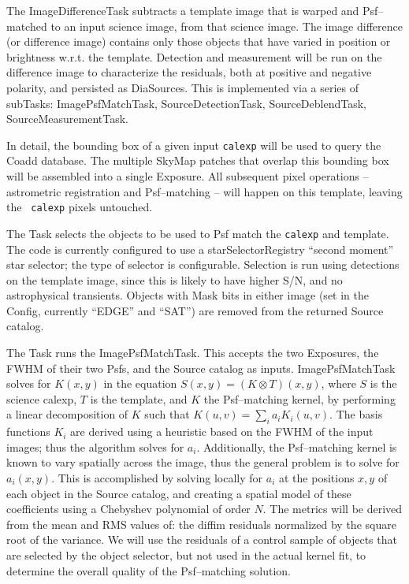 \documentclass[prd, nofootinbib, floatfix, 11pt,tightenlines,times]{article}
\begin{document}

The ImageDifferenceTask subtracts a template image that is warped and
Psf--matched to an input science image, from that science image.  The
image difference (or difference image) contains only those objects
that have varied in position or brightness w.r.t. the template.
Detection and measurement will be run on the difference image to
characterize the residuals, both at positive and negative polarity,
and persisted as DiaSources.  This is implemented via a series of
subTasks: ImagePsfMatchTask, SourceDetectionTask, SourceDeblendTask,
SourceMeasurementTask.

In detail, the bounding box of a given input {\tt calexp} will be used
to query the Coadd database.  The multiple SkyMap patches that overlap
this bounding box will be assembled into a single Exposure.  All
subsequent pixel operations -- astrometric registration and
Psf--matching -- will happen on this template, leaving the {\tt
  calexp} pixels untouched.

The Task selects the objects to be used to Psf match the {\tt calexp}
and template.  The code is currently configured to use a
starSelectorRegistry ``second moment'' star selector; the type of
selector is configurable.  Selection is run using detections on the
template image, since this is likely to have higher S/N,
and no astrophysical transients.  Objects with Mask bits in either
image (set in the Config, currently ``EDGE'' and ``SAT'') are removed
from the returned Source catalog.

The Task runs the ImagePsfMatchTask.  This accepts the two
Exposures, the FWHM of their two Psfs, and the Source catalog as
inputs.  ImagePsfMatchTask solves for $K(x,y)$ in the equation $S(x,y)
= (K \otimes T)(x,y)$, where $S$ is the science calexp, $T$ is the
template, and $K$ the Psf--matching kernel, by performing a linear
decomposition of $K$ such that $K(u,v) = \sum_i a_i K_i(u,v)$.  The
basis functions $K_i$ are derived using a heuristic based on the FWHM
of the input images; thus the algorithm solves for $a_i$.
Additionally, the Psf--matching kernel is known to vary spatially
across the image, thus the general problem is to solve for $a_i(x,y)$.
This is accomplished by solving locally for $a_i$ at the positions
$x,y$ of each object in the Source catalog, and creating a spatial
model of these coefficients using a Chebyshev polynomial of order $N$.
The metrics will be derived from the mean and RMS values of: the diffim
residuals normalized by the square root of the variance.  We will use
the residuals of a control sample of objects that are selected by the
object selector, but not used in the actual kernel fit, to determine
the overall quality of the Psf--matching solution.
\end{document}
